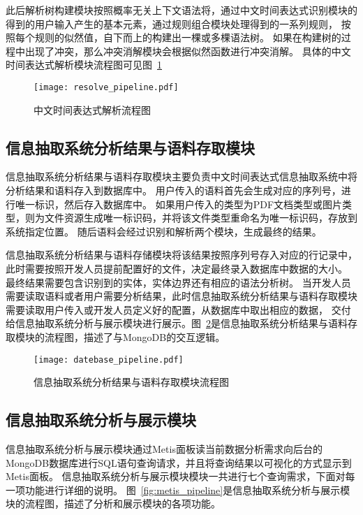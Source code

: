 此后解析树构建模块按照概率无关上下文语法将，通过中文时间表达式识别模块的得到的用户输入产生的基本元素，通过规则组合模块处理得到的一系列规则，
按照每个规则的似然值，自下而上的构建出一棵或多棵语法树。
如果在构建树的过程中出现了冲突，那么冲突消解模块会根据似然函数进行冲突消解。
具体的中文时间表达式解析模块流程图可见图~\ref{fig:resolve_pipeline}

\begin{figure}[h]
  \centering
  \texttt{[image: resolve\_pipeline.pdf]}
  \caption{中文时间表达式解析流程图}
  \label{fig:resolve_pipeline}
\end{figure}

\subsection{信息抽取系统分析结果与语料存取模块}

信息抽取系统分析结果与语料存取模块主要负责中文时间表达式信息抽取系统中将分析结果和语料存入到数据库中。
用户传入的语料首先会生成对应的序列号，进行唯一标识，然后存入数据库中。
如果用户传入的类型为PDF文档类型或图片类型，则为文件资源生成唯一标识码，并将该文件类型重命名为唯一标识码，存放到系统指定位置。
随后语料会经过识别和解析两个模块，生成最终的结果。

信息抽取系统分析结果与语料存储模块将该结果按照序列号存入对应的行记录中，此时需要按照开发人员提前配置好的文件，决定最终录入数据库中数据的大小。
最终结果需要包含识别到的实体，实体边界还有相应的语法分析树。
当开发人员需要读取语料或者用户需要分析结果，此时信息抽取系统分析结果与语料存取模块需要读取用户传入或开发人员定义好的配置，从数据库中取出相应的数据，
交付给信息抽取系统分析与展示模块进行展示。图~\ref{fig:datebase_pipeline}是信息抽取系统分析结果与语料存取模块的流程图，描述了与MongoDB的交互逻辑。

\begin{figure}[h]
  \centering
  \texttt{[image: datebase\_pipeline.pdf]}
  \caption{信息抽取系统分析结果与语料存取模块流程图}
  \label{fig:datebase_pipeline}
\end{figure}

\subsection{信息抽取系统分析与展示模块}

信息抽取系统分析与展示模块通过Metis面板读当前数据分析需求向后台的MongoDB数据库进行SQL语句查询请求，并且将查询结果以可视化的方式显示到Metis面板。
信息抽取系统分析与展示模块模块一共进行七个查询需求，下面对每一项功能进行详细的说明。
图~\ref{fig:metis_pipeline}是信息抽取系统分析与展示模块的流程图，描述了分析和展示模块的各项功能。

